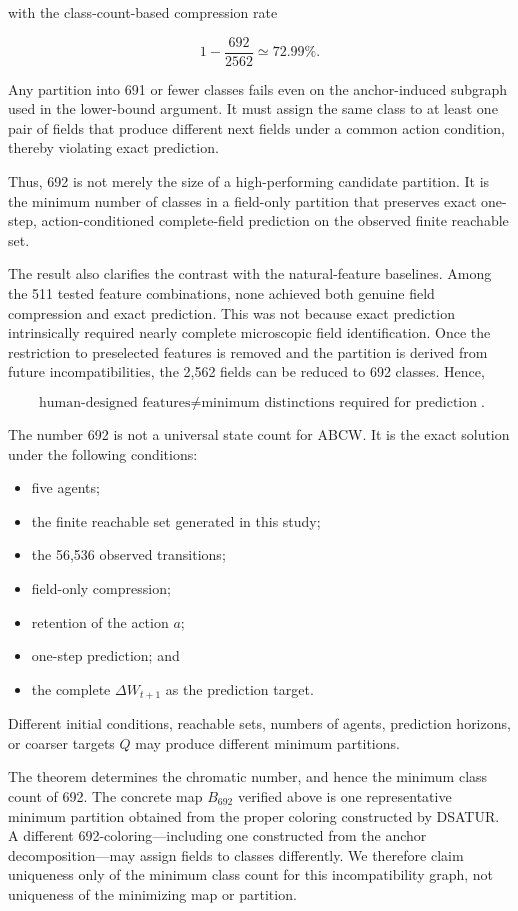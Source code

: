 \documentclass[
  11pt,
]{article}
\providecommand{\tightlist}{%
  \setlength{\itemsep}{0pt}\setlength{\parskip}{0pt}}
\begin{document}
with the class-count-based compression rate

\[{1-\frac{692}{2562}\simeq72.99\%.}\]

Any partition into 691 or fewer classes fails even on the anchor-induced
subgraph used in the lower-bound argument. It must assign the same class
to at least one pair of fields that produce different next fields under
a common action condition, thereby violating exact prediction.

Thus, 692 is not merely the size of a high-performing candidate
partition. It is the minimum number of classes in a field-only partition
that preserves exact one-step, action-conditioned complete-field
prediction on the observed finite reachable set.

The result also clarifies the contrast with the natural-feature
baselines. Among the 511 tested feature combinations, none achieved both
genuine field compression and exact prediction. This was not because
exact prediction intrinsically required nearly complete microscopic
field identification. Once the restriction to preselected features is
removed and the partition is derived from future incompatibilities, the
2,562 fields can be reduced to 692 classes. Hence,

\[{\boxed{\text{human-designed features}\neq\text{minimum distinctions required for prediction}}.}\]

The number 692 is not a universal state count for ABCW. It is the exact
solution under the following conditions:

\begin{itemize}
\tightlist
\item
  five agents;
\item
  the finite reachable set generated in this study;
\item
  the 56,536 observed transitions;
\item
  field-only compression;
\item
  retention of the action \({a}\);
\item
  one-step prediction; and
\item
  the complete \({\Delta W_{t+1}}\) as the prediction target.
\end{itemize}

Different initial conditions, reachable sets, numbers of agents,
prediction horizons, or coarser targets \({Q}\) may produce different
minimum partitions.

The theorem determines the chromatic number, and hence the minimum class
count of 692. The concrete map \({B_{692}}\) verified above is one
representative minimum partition obtained from the proper coloring
constructed by DSATUR. A different 692-coloring---including one
constructed from the anchor decomposition---may assign fields to classes
differently. We therefore claim uniqueness only of the minimum class
count for this incompatibility graph, not uniqueness of the minimizing
map or partition.
\end{document}

